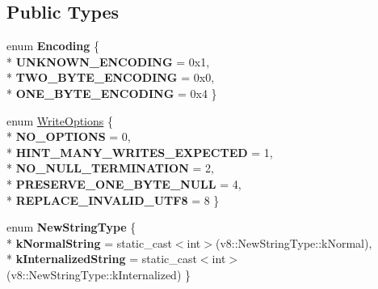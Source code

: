 \subsection*{Public Types}
\begin{DoxyCompactItemize}
\item 
enum {\bfseries Encoding} \{ \\*
{\bfseries U\+N\+K\+N\+O\+W\+N\+\_\+\+E\+N\+C\+O\+D\+I\+NG} = 0x1, 
\\*
{\bfseries T\+W\+O\+\_\+\+B\+Y\+T\+E\+\_\+\+E\+N\+C\+O\+D\+I\+NG} = 0x0, 
\\*
{\bfseries O\+N\+E\+\_\+\+B\+Y\+T\+E\+\_\+\+E\+N\+C\+O\+D\+I\+NG} = 0x4
 \}\hypertarget{classv8_1_1_string_a2f4a2e9516c246eef602b889ce049c49}{}\label{classv8_1_1_string_a2f4a2e9516c246eef602b889ce049c49}

\item 
enum \hyperlink{classv8_1_1_string_a9ce7f1458ffd08f8eb2b9c8dc056e616}{Write\+Options} \{ \\*
{\bfseries N\+O\+\_\+\+O\+P\+T\+I\+O\+NS} = 0, 
\\*
{\bfseries H\+I\+N\+T\+\_\+\+M\+A\+N\+Y\+\_\+\+W\+R\+I\+T\+E\+S\+\_\+\+E\+X\+P\+E\+C\+T\+ED} = 1, 
\\*
{\bfseries N\+O\+\_\+\+N\+U\+L\+L\+\_\+\+T\+E\+R\+M\+I\+N\+A\+T\+I\+ON} = 2, 
\\*
{\bfseries P\+R\+E\+S\+E\+R\+V\+E\+\_\+\+O\+N\+E\+\_\+\+B\+Y\+T\+E\+\_\+\+N\+U\+LL} = 4, 
\\*
{\bfseries R\+E\+P\+L\+A\+C\+E\+\_\+\+I\+N\+V\+A\+L\+I\+D\+\_\+\+U\+T\+F8} = 8
 \}
\item 
enum {\bfseries New\+String\+Type} \{ \\*
{\bfseries k\+Normal\+String} = static\+\_\+cast$<$int$>$(v8\+:\+:New\+String\+Type\+:\+:k\+Normal), 
\\*
{\bfseries k\+Internalized\+String} = static\+\_\+cast$<$int$>$(v8\+:\+:New\+String\+Type\+:\+:k\+Internalized)
 \}\hypertarget{classv8_1_1_string_a37620fb9fdc9b72ec9eea2a2aafaddee}{}\label{classv8_1_1_string_a37620fb9fdc9b72ec9eea2a2aafaddee}

\end{DoxyCompactItemize}
